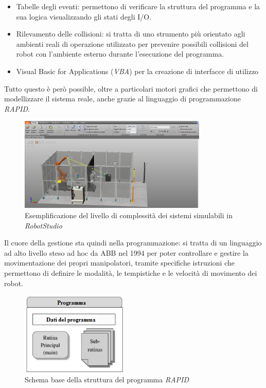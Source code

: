 \begin{itemize}
	\item Tabelle degli eventi: permettono di verificare la struttura del programma e la sua logica visualizzando gli stati degli I/O.
	\item Rilevamento delle collisioni: si tratta di uno strumento più orientato agli ambienti reali di operazione utilizzato per prevenire possibili collisioni del robot con l'ambiente esterno durante l'esecuzione del programma.
	\item Visual Basic for Applications (\emph{VBA}) per la creazione di interfacce di utilizzo 
\end{itemize}
Tutto questo è però possible, oltre a particolari motori grafici che permettono di modellizzare il sistema reale, anche grazie al linguaggio di programmazione \emph{RAPID}.
\begin{figure}
	\centering
	\includegraphics[width=0.8\textwidth]{Immagini/Complex_System}
	\caption{Esemplificazione del livello di complessità dei sistemi simulabili in \emph{RobotStudio}}
	\label{fig:Complex_sys}
\end{figure}

Il cuore della gestione sta quindi nella programmazione: si tratta di un linguaggio ad alto livello steso ad hoc da ABB nel 1994 per poter controllare e gestire la movimentazione dei propri manipolatori, tramite specifiche istruzioni che permettono di definire le modalità, le tempistiche e le velocità di movimento dei robot.
\begin{figure}[h]
	\centering
	\includegraphics[width=0.45\textwidth]{Immagini/Struttura_RAPID}
	\caption{Schema base della struttura del programma \emph{RAPID}}
	\label{fig:Struttura_RAPID}
\end{figure}

